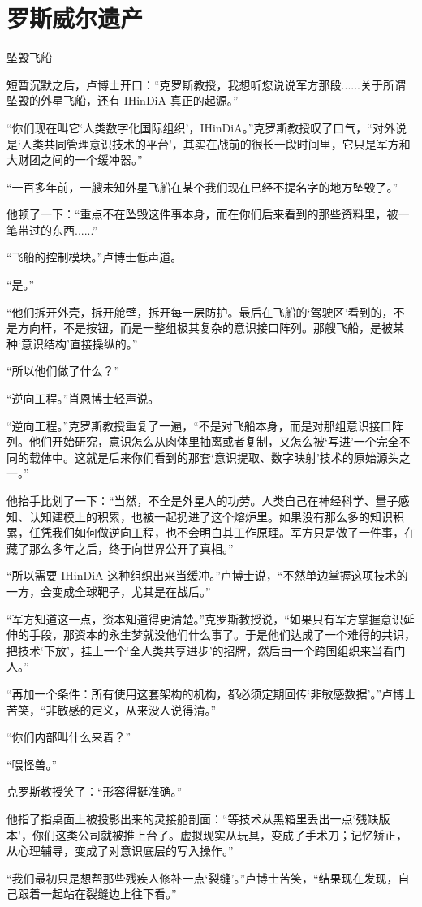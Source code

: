 \chapter{罗斯威尔遗产}

坠毁飞船

短暂沉默之后，卢博士开口：“克罗斯教授，我想听您说说军方那段......关于所谓坠毁的外星飞船，还有 IHinDiA 真正的起源。”

“你们现在叫它‘人类数字化国际组织’，IHinDiA。”克罗斯教授叹了口气，“对外说是‘人类共同管理意识技术的平台’，其实在战前的很长一段时间里，它只是军方和大财团之间的一个缓冲器。”

“一百多年前，一艘未知外星飞船在某个我们现在已经不提名字的地方坠毁了。”

他顿了一下：“重点不在坠毁这件事本身，而在你们后来看到的那些资料里，被一笔带过的东西......”

“飞船的控制模块。”卢博士低声道。

“是。”

“他们拆开外壳，拆开舱壁，拆开每一层防护。最后在飞船的‘驾驶区’看到的，不是方向杆，不是按钮，而是一整组极其复杂的意识接口阵列。那艘飞船，是被某种‘意识结构’直接操纵的。”

“所以他们做了什么？”

“逆向工程。”肖恩博士轻声说。

“逆向工程。”克罗斯教授重复了一遍，“不是对飞船本身，而是对那组意识接口阵列。他们开始研究，意识怎么从肉体里抽离或者复制，又怎么被‘写进’一个完全不同的载体中。这就是后来你们看到的那套‘意识提取、数字映射’技术的原始源头之一。”

他抬手比划了一下：“当然，不全是外星人的功劳。人类自己在神经科学、量子感知、认知建模上的积累，也被一起扔进了这个熔炉里。如果没有那么多的知识积累，任凭我们如何做逆向工程，也不会明白其工作原理。军方只是做了一件事，在藏了那么多年之后，终于向世界公开了真相。”

“所以需要 IHinDiA 这种组织出来当缓冲。”卢博士说，“不然单边掌握这项技术的一方，会变成全球靶子，尤其是在战后。”

“军方知道这一点，资本知道得更清楚。”克罗斯教授说，“如果只有军方掌握意识延伸的手段，那资本的永生梦就没他们什么事了。于是他们达成了一个难得的共识，把技术‘下放’，挂上一个‘全人类共享进步’的招牌，然后由一个跨国组织来当看门人。”

“再加一个条件：所有使用这套架构的机构，都必须定期回传‘非敏感数据’。”卢博士苦笑，“非敏感的定义，从来没人说得清。”

“你们内部叫什么来着？”

“喂怪兽。”

克罗斯教授笑了：“形容得挺准确。”

他指了指桌面上被投影出来的灵接舱剖面：“等技术从黑箱里丢出一点‘残缺版本’，你们这类公司就被推上台了。虚拟现实从玩具，变成了手术刀；记忆矫正，从心理辅导，变成了对意识底层的写入操作。”

“我们最初只是想帮那些残疾人修补一点‘裂缝’。”卢博士苦笑，“结果现在发现，自己跟着一起站在裂缝边上往下看。”
